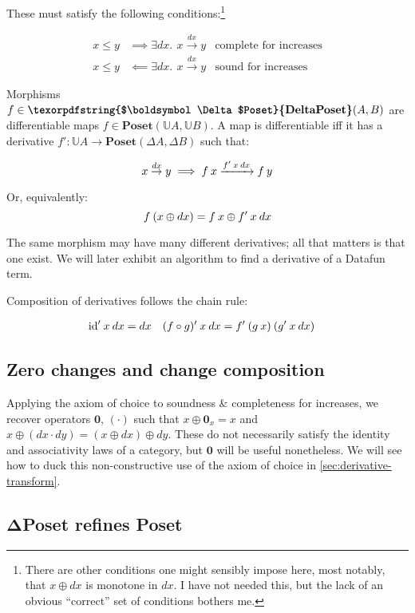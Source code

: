\documentclass{rntz}\usepackage[a5]{rntzgeometry}\usepackage[fullwidth=13cm,width=320pt,width=115mm]{narrow}
\newcommand\mathvar[1]{\ensuremath{#1}} %
\newcommand\cat\textbf
\newcommand\CP{\cat{\texorpdfstring{$\boldsymbol\Delta$Poset}{DeltaPoset}}}
\newcommand\Poset{\cat{Poset}}
\newcommand\D\Delta
\newcommand\zero{\ensuremath{\mathbold{0}}}
\newcommand\<{\mskip 4mu plus 4mu minus 1mu}
\newcommand\dx{\mathvar{dx}}
\newcommand\dy{\mathvar{dy}}
\newcommand\fname\text
\newcommand\id{\fname{id}}
\newcommand\valfn{\ensuremath{\mathbb{U}}}
\newcommand\vals{\valfn}
\newcommand\chgs[1]{\D{#1}}
\newcommand\deriv[1]{\ensuremath{#1'}}
\newcommand\upd{\mathbin{\oplus}}
\newcommand\quantifierspace{~\,}
\newcommand\ex[1]{\exists #1.\quantifierspace}
\newcommand\validarrow\to
\newcommand\valid[1]{\mathrel{\overset{#1}{\validarrow}}}
\newcommand\longvalid[1]{\mathrel{\xrightarrow{#1}}}
\newcommand\vld[3]{{#2 \valid{#1} #3}}
\newcommand\longvld[3]{{#2 \longvalid{#1} #3}}
\begin{document}
\noindent
These must satisfy the following conditions:\footnote{There are other conditions
  one might sensibly impose here, most notably, that $x \upd \dx$ is monotone in
  $\dx$. I have not needed this, but the lack of an obvious ``correct'' set of
  conditions bothers me.}

\begin{align*}
  x \le y &\implies \ex{\dx} \vld{\dx} x y
  & \text{complete for increases}\\
  x \le y &\impliedby \ex{\dx} \vld{\dx} x y
  & \text{sound for increases}
\end{align*}

\noindent
Morphisms $f \in \CP(A,B)$ are differentiable maps $f \in \Poset(\vals A, \vals
B)$. A map is differentiable iff it has a derivative $\deriv f : \vals A \to
\Poset(\chgs A, \chgs B)$ such that:

\[ \vld{\dx} x y \implies \longvld{\deriv f\<x\<\dx}{f\<x}{f\<y}\]

\noindent Or, equivalently:
\[ f\<(x \upd \dx) = f\<x \upd \deriv f\<x\<\dx \]

\noindent
The same morphism may have many different derivatives; all that matters is that
one exist. We will later exhibit an algorithm to find a derivative of a Datafun
term.

Composition of derivatives follows the chain rule:

\begin{align*}
  \deriv\id \<x\<\dx &= \dx
  & \deriv{(f \circ g)} \<x\<\dx &= \deriv f \<(g\<x) \<(\deriv g\<x\<\dx)
\end{align*}


\subsection{Zero changes and change composition}

Applying the axiom of choice to soundness \& completeness for increases, we
recover operators $\zero$, $(\cdot)$ such that $x \upd \zero_x = x$ and $x \upd
(\dx \cdot \dy) = (x \upd \dx) \upd \dy$. These do not necessarily satisfy the
identity and associativity laws of a category, but $\zero$ will be useful
nonetheless. We will see how to duck this non-constructive use of the axiom of
choice in \cref{sec:derivative-transform}.


\subsection{\CP{} refines \Poset{}}
\label{sec:refines}
\end{document}
